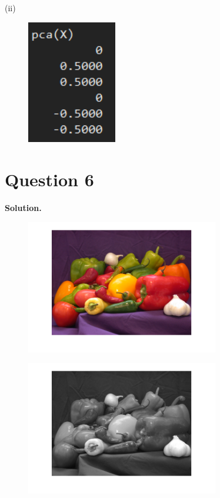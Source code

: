 \documentclass[11pt]{article}
\begin{document}
\clearpage
(ii)
\begin{figure}[!h]
  \centering
  \includegraphics[width=0.35\textwidth]{../q5/pcaX.png}
  \label{fig:pcaX}
\end{figure}



\clearpage
\section*{Question 6}

\textbf{Solution.}



\begin{figure}[!h]
  \centering
  \includegraphics[width=0.75\textwidth]{../q6/peppers.png}
  \label{fig:pep}
\end{figure}


\begin{figure}[!h]
  \centering
  \includegraphics[width=0.75\textwidth]{../q6/peppers_gray.png}
  \label{fig:pepgray}
\end{figure}
\end{document}
